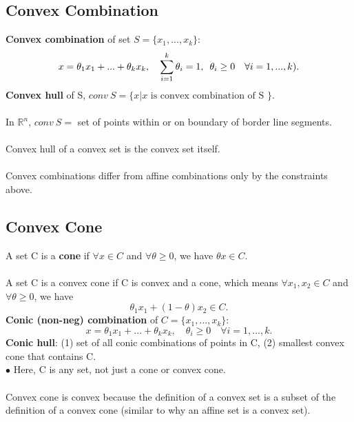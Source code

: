 \documentclass[]{article}
\begin{document}
\subsection*{Convex Combination}
\textbf{Convex combination} of set $S=\{x_{1},...,x_{k}\}$: $$x=\theta_{1} x_{1} + ... + \theta_{k} x_{k}, \quad  \sum_{i=1}^{k} \theta_{i}=1 , \enskip \theta_{i} \geq 0 \quad \forall i=1,...,k).$$
\textbf{Convex hull} of S, $conv \ S=\{x|x \text{ is convex combination of S }\}.$ \\\\
In $\mathbb{R}^{n}$, $conv \ S =$ set of points within or on boundary of border line segments. \\\\
Convex hull of a convex set is the convex set itself. \\\\
Convex combinations differ from affine combinations only by the constraints above. \\

\subsection*{Convex Cone}
A set C is a \textbf{cone} if $\forall x \in C$ and $\forall \theta \geq 0$, we have $\theta x \in C.$ \\\\
A set C is a convex cone if C is convex and a cone, which means $\forall x_{1}, x_{2} \in C$ and $\forall \theta \geq 0$, we have $$\theta_{1} x_{1} + (1-\theta) x_{2} \in C.$$
\textbf{Conic (non-neg) combination} of $C=\{x_{1},..., x_{k}\}:$ $$x=\theta_1 x_{1} + ... + \theta_k x_{k}, \quad \theta_i \geq 0 \quad \forall i=1,..., k.$$
\textbf{Conic hull}: (1) set of all conic combinations of points in C, (2) smallest convex cone that contains C.\\
$\bullet$ Here, C is any set, not just a cone or convex cone. \\\\
Convex cone is convex because the definition of a convex set is a subset of the definition of a convex cone (similar to why an affine set is a convex set). \\
\end{document}
